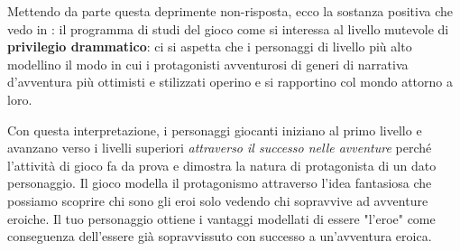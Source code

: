
Mettendo da parte questa deprimente non-risposta, ecco la sostanza positiva che vedo in \dnd{}: il programma di studi del gioco come  si interessa al livello mutevole di \textbf{privilegio drammatico}: ci si aspetta che i personaggi di livello più alto modellino il modo in cui i protagonisti avventurosi di generi di narrativa d'avventura più ottimisti e stilizzati operino e si rapportino col mondo attorno a loro.

Con questa interpretazione, i personaggi giocanti iniziano al primo livello e avanzano verso i livelli superiori \textit{attraverso il successo nelle avventure} perché l'attività di gioco fa da prova e dimostra la natura di protagonista di un dato personaggio. Il gioco modella il protagonismo attraverso l'idea fantasiosa che possiamo scoprire chi sono gli eroi solo vedendo chi sopravvive ad avventure eroiche. Il tuo personaggio ottiene i vantaggi modellati di essere "l'eroe" come conseguenza dell'essere già sopravvissuto con successo a un'avventura eroica.